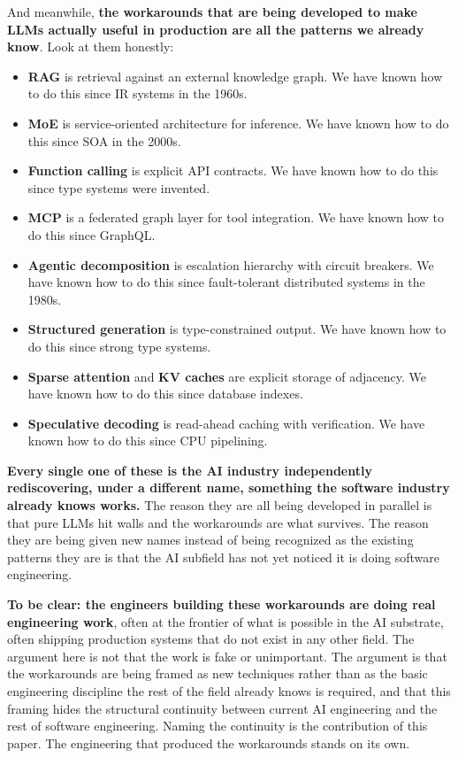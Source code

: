 \documentclass[11pt]{article}
\begin{document}
And meanwhile, \textbf{the workarounds that are being developed to make LLMs actually useful in production are all the patterns we already know}. Look at them honestly:

\begin{itemize}[leftmargin=*]
\item \textbf{RAG} is retrieval against an external knowledge graph. We have known how to do this since IR systems in the 1960s.
\item \textbf{MoE} is service-oriented architecture for inference. We have known how to do this since SOA in the 2000s.
\item \textbf{Function calling} is explicit API contracts. We have known how to do this since type systems were invented.
\item \textbf{MCP} is a federated graph layer for tool integration. We have known how to do this since GraphQL.
\item \textbf{Agentic decomposition} is escalation hierarchy with circuit breakers. We have known how to do this since fault-tolerant distributed systems in the 1980s.
\item \textbf{Structured generation} is type-constrained output. We have known how to do this since strong type systems.
\item \textbf{Sparse attention} and \textbf{KV caches} are explicit storage of adjacency. We have known how to do this since database indexes.
\item \textbf{Speculative decoding} is read-ahead caching with verification. We have known how to do this since CPU pipelining.
\end{itemize}

\textbf{Every single one of these is the AI industry independently rediscovering, under a different name, something the software industry already knows works.} The reason they are all being developed in parallel is that pure LLMs hit walls and the workarounds are what survives. The reason they are being given new names instead of being recognized as the existing patterns they are is that the AI subfield has not yet noticed it is doing software engineering.

\textbf{To be clear: the engineers building these workarounds are doing real engineering work}, often at the frontier of what is possible in the AI substrate, often shipping production systems that do not exist in any other field. The argument here is not that the work is fake or unimportant. The argument is that the workarounds are being framed as new techniques rather than as the basic engineering discipline the rest of the field already knows is required, and that this framing hides the structural continuity between current AI engineering and the rest of software engineering. Naming the continuity is the contribution of this paper. The engineering that produced the workarounds stands on its own.
\end{document}
